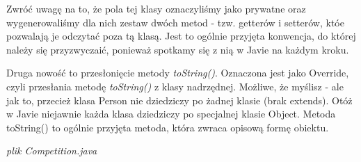 \documentclass[letterpaper,10pt,english]{sphinxmanual}
\begin{document}
Zwróć uwagę na to, że pola tej klasy oznaczyliśmy jako prywatne oraz wygenerowaliśmy dla nich zestaw dwóch metod - tzw. getterów i setterów, któe pozwalają je odczytać poza tą klasą. Jest to ogólnie przyjęta konwencja, do której należy się przyzwyczaić, ponieważ spotkamy się z nią w Javie na każdym kroku.

Druga nowość to przesłonięcie metody \emph{toString()}. Oznaczona jest jako Override, czyli przesłania metodę \emph{toString()} z klasy nadrzędnej. Możliwe, że myślisz - ale jak to, przecież klasa Person nie dziedziczy po żadnej klasie (brak extends). Otóż w Javie niejawnie każda klasa dziedziczy po specjalnej klasie Object. Metoda toString() to ogólnie przyjęta metoda, która zwraca opisową formę obiektu.

\emph{plik Competition.java}
\end{document}

